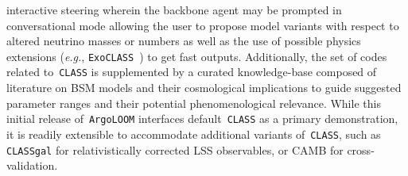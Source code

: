 \documentclass[final,3p,times,sort,compress]{elsarticle}
\newcommand{\AL}{\texttt{ArgoLOOM}\xspace}
\newcommand{\CLASS}{\texttt{CLASS}\xspace}
\begin{document}
interactive steering wherein the backbone agent may be prompted in conversational mode allowing the user to
propose model variants with respect to altered neutrino masses or numbers as well as the use of possible physics
extensions ({\it e.g.}, \texttt{ExoCLASS}~\cite{Stocker:2018avm}) to get fast outputs.
%
Additionally, the set of codes related to~\CLASS is supplemented by a curated knowledge-base composed of literature
on BSM models and their cosmological implications to guide suggested parameter ranges and their
potential phenomenological relevance.
%
While this initial release of~\AL interfaces default~\CLASS as a primary demonstration,
it is readily extensible to accommodate additional variants of~\CLASS, such as \texttt{CLASSgal} \cite{DiDio:2013bqa} for
relativistically corrected LSS observables, or CAMB for cross-validation.

\end{document}
